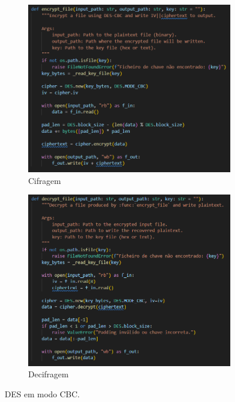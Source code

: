 \documentclass[a4paper]{article}
\begin{document}
\begin{figure}[H]
	\centering
	\begin{subfigure}[b]{0.48\textwidth}
		\centering
		\includegraphics[width=\textwidth]{Recursos/des_enc.png}
		\caption{Cifragem}
		\label{fig:des_enc}
	\end{subfigure}
	\hfill
	\begin{subfigure}[b]{0.48\textwidth}
		\centering
		\includegraphics[width=\textwidth]{Recursos/des_dec.png}
		\caption{Decifragem}
		\label{fig:des_dec}
	\end{subfigure}
	\caption{DES em modo CBC.}
	\label{fig:des_combined}
\end{figure}
\newpage
\end{document}
